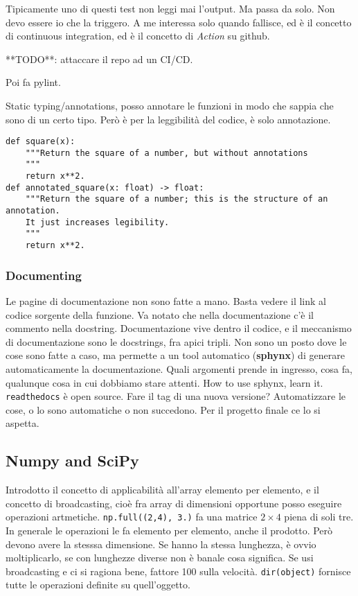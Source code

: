 \documentclass[10pt, a4paper, titlepage]{book}
\begin{document}
Tipicamente uno di questi test non leggi mai l'output. Ma passa da solo. Non devo essere io che la triggero. A me interessa solo quando fallisce, ed è il concetto di continuous integration, ed è il concetto di \textit{Action} su github.

**TODO**: attaccare il repo ad un CI/CD.

Poi fa pylint.

Static typing/annotations, posso annotare le funzioni in modo che sappia che sono di un certo tipo. Però è per la leggibilità del codice, è solo annotazione.
\begin{verbatim}
def square(x):
	"""Return the square of a number, but without annotations
	"""
	return x**2.
def annotated_square(x: float) -> float:
	"""Return the square of a number; this is the structure of an annotation.
	It just increases legibility.
	"""
	return x**2.	
\end{verbatim}

\subsubsection{Documenting}

Le pagine di documentazione non sono fatte a mano. Basta vedere il link al codice sorgente della funzione. 
Va notato che nella documentazione c'è il commento nella docstring.
Documentazione vive dentro il codice, e il meccanismo di documentazione sono le docstrings, fra apici tripli.
Non sono un posto dove le cose sono fatte a caso, ma permette a un tool automatico (\textbf{sphynx}) di generare automaticamente la documentazione.
Quali argomenti prende in ingresso, cosa fa, qualunque cosa in cui dobbiamo stare attenti.
How to use sphynx, learn it. \texttt{readthedocs} è open source.
Fare il tag di una nuova versione?
Automatizzare le cose, o lo sono automatiche o non succedono.
Per il progetto finale ce lo si aspetta.

\subsection{Numpy and SciPy}

Introdotto il concetto di applicabilità all'array elemento per elemento, e il concetto di broadcasting, cioè fra array di dimensioni opportune posso eseguire operazioni artmetiche.
\texttt{np.full((2,4), 3.)} fa una matrice $2\times4$ piena di soli tre.
In generale le operazioni le fa elemento per elemento, anche il prodotto. Però devono avere la stesssa dimensione.
Se hanno la stessa lunghezza, è ovvio moltiplicarlo, se con lunghezze diverse non è banale cosa significa.
Se usi broadcasting e ci si ragiona bene, fattore 100 sulla velocità.
\texttt{dir(object)} fornisce tutte le operazioni definite su quell'oggetto.
\end{document}
